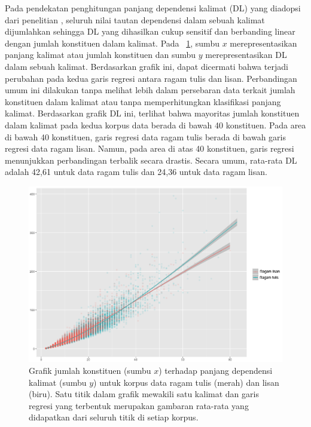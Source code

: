 Pada pendekatan penghitungan panjang dependensi kalimat (DL) yang diadopsi dari penelitian \cite{futrell2015large}, seluruh nilai tautan dependensi dalam sebuah kalimat dijumlahkan sehingga DL yang dihasilkan cukup sensitif dan berbanding linear dengan jumlah konstituen dalam kalimat. Pada \pic~\ref{fig:lisantulis_DL}, sumbu $x$ merepresentasikan panjang kalimat atau jumlah konstituen dan sumbu $y$ merepresentasikan DL dalam sebuah kalimat. Berdasarkan grafik ini, dapat dicermati bahwa terjadi perubahan pada kedua garis regresi antara ragam tulis dan lisan. Perbandingan umum ini dilakukan tanpa melihat lebih dalam persebaran data terkait jumlah konstituen dalam kalimat atau tanpa memperhitungkan klasifikasi panjang kalimat. Berdasarkan grafik DL ini, terlihat bahwa mayoritas jumlah konstituen dalam kalimat pada kedua korpus data berada di bawah 40 konstituen. Pada area di bawah 40 konstituen, garis regresi data ragam tulis berada di bawah garis regresi data ragam lisan. Namun, pada area di atas 40 konstituen, garis regresi menunjukkan perbandingan terbalik secara drastis. Secara umum, rata-rata DL adalah 42,61 untuk data ragam tulis dan 24,36 untuk data ragam lisan. 

\begin{figure}
	\centering \includegraphics[width=1
	\textwidth] {pics/lisantulis_DL.png} 
	\caption{Grafik jumlah konstituen (sumbu $x$) terhadap panjang dependensi kalimat (sumbu $y$) untuk korpus data ragam tulis (merah) dan lisan (biru). Satu titik dalam grafik mewakili satu kalimat dan garis regresi yang terbentuk merupakan gambaran rata-rata yang didapatkan dari seluruh titik di setiap korpus.} 
\label{fig:lisantulis_DL} 
\end{figure}

